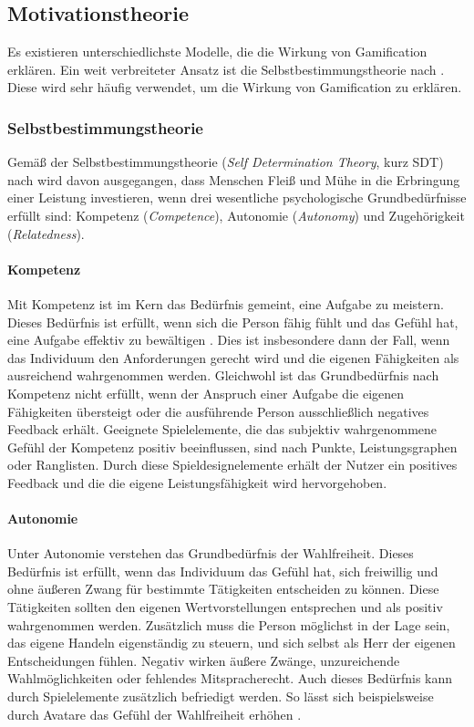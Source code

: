 \subsection{Motivationstheorie}
Es existieren unterschiedlichste Modelle, die die Wirkung von Gamification erklären. Ein weit verbreiteter Ansatz ist die Selbstbestimmungstheorie nach . Diese wird sehr häufig verwendet, um die Wirkung von Gamification zu erklären\cite{rapp2019strengthening}.

\subsubsection{Selbstbestimmungstheorie}
Gemäß der Selbstbestimmungstheorie (\textit{Self Determination Theory}, kurz SDT) nach  wird davon ausgegangen, dass Menschen Fleiß und Mühe in die Erbringung einer Leistung investieren, wenn drei wesentliche psychologische Grundbedürfnisse erfüllt sind: Kompetenz (\textit{Competence}), Autonomie (\textit{Autonomy}) und Zugehörigkeit (\textit{Relatedness}).

 \paragraph{Kompetenz}
 Mit Kompetenz ist im Kern das Bedürfnis gemeint, eine Aufgabe zu meistern. Dieses Bedürfnis ist erfüllt, wenn sich die Person fähig fühlt und das Gefühl hat, eine Aufgabe effektiv zu bewältigen \cite{ryan2017self}. Dies ist insbesondere dann der Fall, wenn das Individuum den Anforderungen gerecht wird und die eigenen Fähigkeiten als ausreichend wahrgenommen werden. Gleichwohl ist das Grundbedürfnis nach Kompetenz nicht erfüllt, wenn der Anspruch einer Aufgabe die eigenen Fähigkeiten übersteigt oder die ausführende Person ausschließlich negatives Feedback erhält. Geeignete Spielelemente, die das subjektiv wahrgenommene Gefühl der Kompetenz positiv beeinflussen, sind nach  Punkte, Leistungsgraphen oder Ranglisten. Durch diese Spieldesignelemente erhält der Nutzer ein positives Feedback und die die eigene Leistungsfähigkeit wird hervorgehoben.
 
 
 \paragraph{Autonomie}
 Unter Autonomie verstehen  das Grundbedürfnis der Wahlfreiheit. Dieses Bedürfnis ist erfüllt, wenn das Individuum das Gefühl hat, sich freiwillig und ohne äußeren Zwang für bestimmte Tätigkeiten entscheiden zu können. Diese Tätigkeiten sollten den eigenen Wertvorstellungen entsprechen und als positiv wahrgenommen werden. Zusätzlich muss die Person möglichst in der Lage sein, das eigene Handeln eigenständig zu steuern, und sich selbst als Herr der eigenen Entscheidungen fühlen. Negativ wirken äußere Zwänge, unzureichende Wahlmöglichkeiten oder fehlendes Mitspracherecht. Auch dieses Bedürfnis kann durch Spielelemente zusätzlich befriedigt werden. So lässt sich beispielsweise durch Avatare das Gefühl der Wahlfreiheit erhöhen \cite{sailer2016wirkung}.
  
